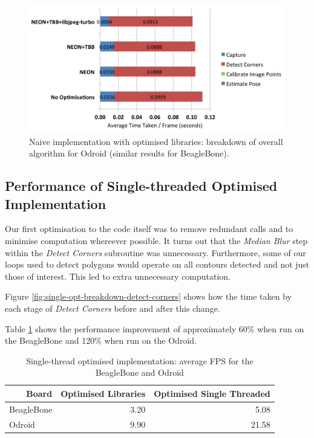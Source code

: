 \documentclass{acm_proc_article-sp}
\begin{document}
\begin{figure}[htbp]
\centering
\includegraphics[width=\textwidth]{images/performance/libraries-breakdown-overall.png}
\caption{Naive implementation with optimised libraries: breakdown of overall algorithm for Odroid (similar results for BeagleBone).}
\label{fig:libraries-breakdown-overall}
\end{figure}

\subsection{Performance of Single-threaded Optimised Implementation}

Our first optimisation to the code itself was to remove redundant calls and to minimise computation whereever possible. It turns out that the \textit{Median Blur} step within the \textit{Detect Corners} subroutine was unnecessary. Furthermore, some of our loops used to detect polygons would operate on all contours detected and not just those of interest. This led to extra unnecessary computation.  


Figure \ref{fig:single-opt-breakdown-detect-corners} shows how the time taken by each stage of \textit{Detect Corners} before and after this change.


Table \ref{tab:single-threaded-optimisation-bb-odroid-fps} shows the performance improvement of approximately 60\% when run on the BeagleBone and 120\% when run on the Odroid. 

\begin{table}[htbp]
  \centering
    \begin{tabular}{rrr}
    \toprule
    \textbf{Board} & \textbf{Optimised Libraries} & \textbf{Optimised Single Threaded} \\
    \midrule
    \multicolumn{1}{l}{BeagleBone} & 3.20  & 5.08 \\
    \multicolumn{1}{l}{Odroid} & 9.90  & 21.58 \\
    \bottomrule
    \end{tabular}%
  \caption{Single-thread optimised implementation: average FPS for the BeagleBone and 
  Odroid}
  \label{tab:single-threaded-optimisation-bb-odroid-fps}%
\end{table}%
\end{document}
